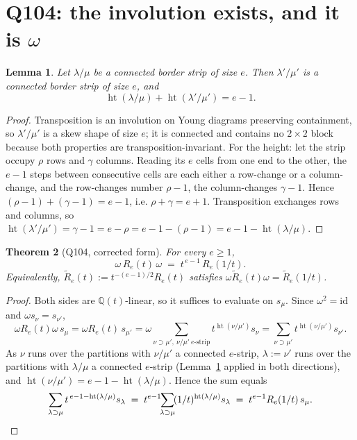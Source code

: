 \documentclass[11pt]{article}
\newtheorem{theorem}{Theorem}
\newtheorem{lemma}[theorem]{Lemma}
\theoremstyle{definition}
\newcommand{\hgt}{\operatorname{ht}}   %
\newcommand{\Q}{\mathbb{Q}}
\begin{document}
\section{Q104: the involution exists, and it is $\omega$}

\begin{lemma}\label{lem:transpose}
Let $\lambda/\mu$ be a connected border strip of size $e$.  Then $\lambda'/\mu'$ is a
connected border strip of size $e$, and
\[
  \hgt(\lambda/\mu)+\hgt(\lambda'/\mu')=e-1 .
\]
\end{lemma}

\begin{proof}
Transposition is an involution on Young diagrams preserving containment, so
$\lambda'/\mu'$ is a skew shape of size $e$; it is connected and contains no $2\times2$
block because both properties are transposition-invariant.  For the height: let the
strip occupy $\rho$ rows and $\gamma$ columns.  Reading its $e$ cells from one end to
the other, the $e-1$ steps between consecutive cells are each either a row-change or a
column-change, and the row-changes number $\rho-1$, the column-changes $\gamma-1$.
Hence $(\rho-1)+(\gamma-1)=e-1$, i.e. $\rho+\gamma=e+1$.  Transposition exchanges rows
and columns, so $\hgt(\lambda'/\mu')=\gamma-1=e-\rho=e-1-(\rho-1)
=e-1-\hgt(\lambda/\mu)$.
\end{proof}

\begin{theorem}[Q104, corrected form]\label{thm:B}
For every $e\ge1$,
\[
  \boxed{\ \omega\,R_e(t)\,\omega\;=\;t^{\,e-1}\,R_e(1/t).\ }
\]
Equivalently, $\widetilde R_e(t):=t^{-(e-1)/2}R_e(t)$ satisfies
$\omega\widetilde R_e(t)\omega=\widetilde R_e(1/t)$.
\end{theorem}

\begin{proof}
Both sides are $\Q(t)$-linear, so it suffices to evaluate on $s_\mu$.  Since
$\omega^2=\mathrm{id}$ and $\omega s_\nu=s_{\nu'}$,
\[
  \omega R_e(t)\omega\, s_\mu
  =\omega R_e(t)\,s_{\mu'}
  =\omega\!\!\sum_{\nu\supset\mu',\ \nu/\mu'\ e\text{-strip}}\!\! t^{\hgt(\nu/\mu')}s_\nu
  =\!\!\sum_{\nu\supset\mu'}\!\! t^{\hgt(\nu/\mu')}s_{\nu'} .
\]
As $\nu$ runs over the partitions with $\nu/\mu'$ a connected $e$-strip,
$\lambda:=\nu'$ runs over the partitions with $\lambda/\mu$ a connected $e$-strip
(Lemma~\ref{lem:transpose} applied in both directions), and
$\hgt(\nu/\mu')=e-1-\hgt(\lambda/\mu)$.  Hence the sum equals
\[
  \sum_{\lambda\supset\mu} t^{\,e-1-\hgt(\lambda/\mu)}s_\lambda
  \;=\;t^{e-1}\!\!\sum_{\lambda\supset\mu}\!(1/t)^{\hgt(\lambda/\mu)}s_\lambda
  \;=\;t^{e-1}R_e(1/t)\,s_\mu . \qedhere
\]
\end{proof}
\end{document}
